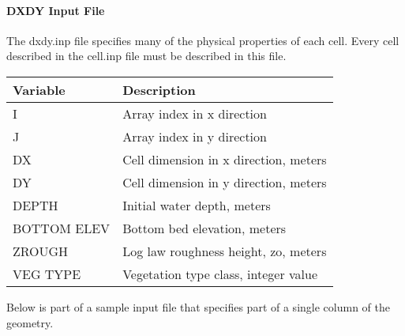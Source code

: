 \documentclass[letterpaper,10pt,english]{sphinxmanual}
\begin{document}
\begin{sphinxVerbatim}[commandchars=\\\{\}]
       
             
     
       
       
       
       
       
     
\end{sphinxVerbatim}


\paragraph{DXDY Input File}
\label{\detokenize{inputfiles/spatial/dxdy_rst:dxdy-input-file}}\label{\detokenize{inputfiles/spatial/dxdy_rst:dxdy-rst}}\label{\detokenize{inputfiles/spatial/dxdy_rst::doc}}
The dxdy.inp file specifies many of the physical properties of each cell.  Every cell described in the cell.inp file must be described in this file.


\begin{savenotes}\sphinxattablestart
\centering
\begin{tabulary}{\linewidth}[t]{|T|T|}
\hline
\sphinxstyletheadfamily 
Variable
&\sphinxstyletheadfamily 
Description
\\
\hline
I
&
Array index in x direction
\\
\hline
J
&
Array index in y direction
\\
\hline
DX
&
Cell dimension in x direction, meters
\\
\hline
DY
&
Cell dimension in y direction, meters
\\
\hline
DEPTH
&
Initial water depth, meters
\\
\hline
BOTTOM ELEV
&
Bottom bed elevation, meters
\\
\hline
ZROUGH
&
Log law roughness height, zo, meters
\\
\hline
VEG TYPE
&
Vegetation type class, integer value
\\
\hline
\end{tabulary}
\par
\sphinxattableend\end{savenotes}

Below is part of a sample input file that specifies part of a single column of the geometry.
\end{document}
